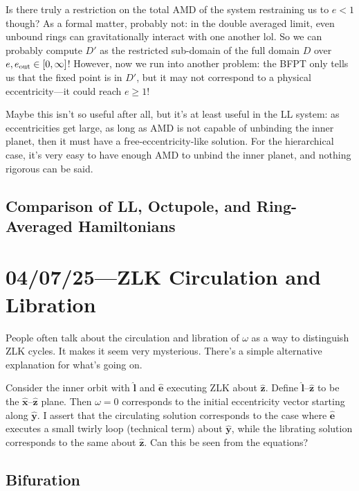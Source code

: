 \documentclass[12pt]{article}
\newcommand*{\bm}[1]{\boldsymbol{\mathbf{#1}}}
\newcommand*{\uv}[1]{\hat{\bm{#1}}}
\begin{document}
Is there truly a restriction on the total AMD of the system restraining us to $e
< 1$ though?
As a formal matter, probably not:
in the double averaged limit, even unbound rings can gravitationally interact
with one another lol.
So we can probably compute $D'$ as the restricted sub-domain of the full domain
$D$ over $e, e_{\rm out} \in [0, \infty]$!
However, now we run into another problem: the BFPT only tells us that the fixed
point is in $D'$, but it may not correspond to a physical eccentricity---it
could reach $e \geq 1$!

Maybe this isn't so useful after all, but it's at least useful in the LL
system: as eccentricities get large, as long as AMD is not capable of unbinding
the inner planet, then it must have a free-eccentricity-like solution.
For the hierarchical case, it's very easy to have enough AMD to unbind the inner
planet, and nothing rigorous can be said.

\subsection{Comparison of LL, Octupole, and Ring-Averaged Hamiltonians}


\section{04/07/25---ZLK Circulation and Libration}

People often talk about the circulation and libration of $\omega$ as a way to
distinguish ZLK cycles.
It makes it seem very mysterious.
There's a simple alternative explanation for what's going on.

Consider the inner orbit with $\uv{l}$ and $\uv{e}$ executing ZLK about
$\uv{z}$.
Define $\uv{l}$--$\uv{z}$ to be the $\uv{x}$--$\uv{z}$ plane.
Then $\omega = 0$ corresponds to the initial eccentricity vector starting along
$\uv{y}$.
I assert that the circulating solution corresponds to the case where $\uv{e}$
executes a small twirly loop (technical term) about $\uv{y}$, while the
librating solution corresponds to the same about $\uv{z}$.
Can this be seen from the equations?

\subsection{Bifuration}
\end{document}
